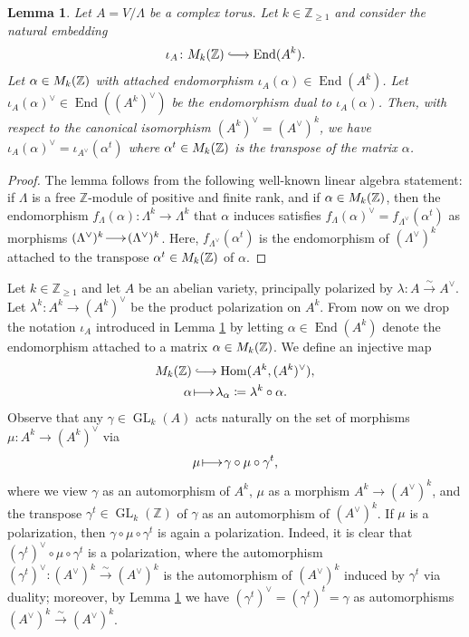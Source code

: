 \documentclass[a4paper,11pt,reqno]{amsart}
\makeatletter
\newcommand*{\longhookrightarrow}{\ensuremath{\lhook\joinrel\relbar\joinrel\rightarrow}}
\numberwithin{equation}{section}
\theoremstyle{plain}
\newtheorem{lemma}[theorem]{Lemma}
\theoremstyle{definition}
\newcommand{\Z}{\mathbb Z}
\let\rm\relax
\newcommand{\rm}[1]{{\mathrm{#1}}}
\newcommand{\Hom}{\operatorname{Hom}}
\newcommand{\End}{\operatorname{End}}
\newcommand{\GL}{\operatorname{GL}}
\renewcommand{\longrightarrow}{\xymatrix@1@=15pt{\ar[r]&}}
\renewcommand{\mapsto}{\xymatrix@1@=15pt{\ar@{|->}[r]&}}
\makeatother
\begin{document}
\begin{lemma} \label{lemma:complextorusduality}
    Let $A = V/\Lambda$ be a complex torus. Let $k\in \Z_{\geq 1}$ and consider the natural embedding
    \[
    \iota_A \colon \rm{M}_k(\Z) \longhookrightarrow \End(A^k). 
    \]
    Let $\alpha \in \rm{M}_k(\Z)$ with attached endomorphism $\iota_A(\alpha) \in \End(A^k)$. 
    Let $\iota_A(\alpha)^\vee \in \End((A^k)^\vee)$ be the endomorphism dual to $\iota_A(\alpha)$.
    Then, with respect to the canonical isomorphism $(A^k)^\vee = (A^\vee)^k$, we have $\iota_A(\alpha)^\vee = \iota_{A^\vee}(\alpha^t)$ where $\alpha^t \in \rm{M}_k(\Z)$ is the transpose of the matrix $\alpha$.  
\end{lemma}

\begin{proof}
The lemma follows from the following well-known linear algebra statement: if $\Lambda$ is a free $\Z$-module of positive and finite rank, and if $\alpha  \in \rm{M}_k(\Z)$, then the endomorphism $f_\Lambda(\alpha) \colon \Lambda^k \to \Lambda^k$ that $\alpha$ induces satisfies
$
f_\Lambda(\alpha)^\vee = f_{\Lambda^\vee}(\alpha^t)$ as morphisms $(\Lambda^\vee)^k \longrightarrow (\Lambda^\vee)^k$. Here, $f_{\Lambda^\vee}(\alpha^t)$ is the endomorphism of $(\Lambda^\vee)^k$ attached to the transpose $\alpha^t \in \rm{M}_k(\Z)$ of $\alpha$. 
\end{proof}

Let $k \in \Z_{\geq 1}$ and let $A$ be an abelian variety, 
principally polarized by $\lambda \colon A \xrightarrow{\sim} A^\vee$. Let $\lambda^k \colon A^k \to (A^k)^\vee$ be the product polarization on $A^k$. 
From now on we drop the notation $\iota_A$ introduced in Lemma \ref{lemma:complextorusduality} by letting $\alpha \in \End(A^k)$ denote the endomorphism attached to a matrix $\alpha \in \rm{M}_k(\Z)$.
We define an injective map
\begin{align} \label{align:lambda-alpha}
\begin{split}
\rm{M}_k(\Z) &\longhookrightarrow \Hom(A^k, (A^k)^\vee),\\
\alpha &\mapsto \lambda_\alpha \coloneqq \lambda^k \circ \alpha. 
\end{split}
\end{align} 
Observe that any $\gamma\in \GL_k(A) $ acts naturally on the set of morphisms $\mu \colon A^k \to (A^k)^\vee$ via 
\begin{align} \label{align:action-aut-polarizations}
\mu\mapsto \gamma \circ \mu \circ \gamma^t,
\end{align}
where we view $\gamma$ as an automorphism of $A^k$, $\mu$ as a morphism $A^k \to (A^\vee)^k$, and the transpose $\gamma^t \in \GL_k(\Z)$ of $\gamma$ as an automorphism of $(A^\vee)^k$. If $\mu$ is a polarization, then $\gamma \circ \mu \circ \gamma^t$ is again a polarization. Indeed, it is clear that $(\gamma^{t})^\vee \circ \mu \circ \gamma^t$ is a polarization, where the automorphism $(\gamma^t)^\vee \colon (A^\vee)^k\xrightarrow{\sim} (A^\vee)^k$ is the automorphism of $(A^\vee)^k$ induced by $\gamma^t$ via duality; moreover, by Lemma \ref{lemma:complextorusduality} we have $(\gamma^t)^\vee = (\gamma^t)^t = \gamma$ as automorphisms $(A^\vee)^k\xrightarrow{\sim} (A^\vee)^k$. 
\end{document}
